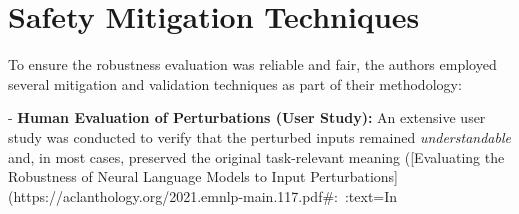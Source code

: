 \section{Safety Mitigation Techniques}
To ensure the robustness evaluation was reliable and fair, the authors employed several mitigation and validation techniques as part of their methodology:

- \textbf{Human Evaluation of Perturbations (User Study):} An extensive user study was conducted to verify that the perturbed inputs remained \textit{understandable} and, in most cases, preserved the original task-relevant meaning ([Evaluating the Robustness of Neural Language Models to Input Perturbations](https://aclanthology.org/2021.emnlp-main.117.pdf#:~:text=In%